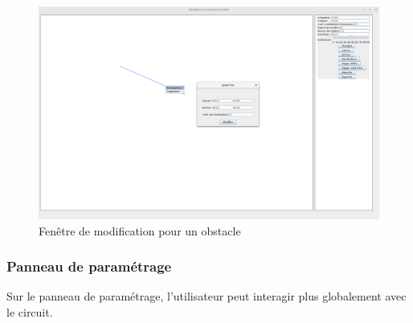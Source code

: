 \documentclass{report}
\begin{document}
\begin{figure}[H]
\centering
\includegraphics[scale=0.25]{modifier_obstacle.png}
\caption{Fenêtre de modification pour un obstacle}
\end{figure}

\subsubsection{Panneau de paramétrage}

Sur le panneau de paramétrage, l’utilisateur peut interagir plus globalement avec le circuit. \\
\end{document}
